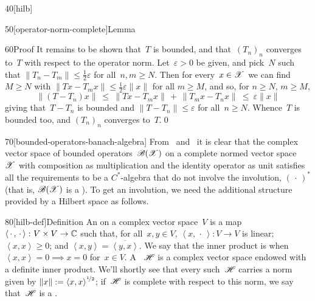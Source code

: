 \begin{parsec}{40}[hilb]
\begin{point}{50}[operator-norm-complete]{Lemma}
\begin{point}{60}{Proof}
It remains to be shown that~$T$ is bounded,
and that~$(T_n)_n$ converges to~$T$ with respect to the operator norm.
Let~$\varepsilon>0$ be given, and pick~$N$ such that
$\|T_n-T_m\|\leq \frac{1}{2}\varepsilon$ for all~$n,m\geq N$.
Then for every~$x\in \mathscr{X}$
we can find~$M\geq N$ with 
$\|T x - T_m x\|\leq \frac{1}{2}\varepsilon\|x\|$ for all $m\geq M$,
and so,
for $n\geq N$, $m\geq M$,
\begin{equation*}
\|(T - T_n) x\| \ \leq\ \|T x - T_mx\|\,+\,\|T_m x - T_n x\|
\ \leq\  \varepsilon\|x\|
\end{equation*}
giving that~$T-T_n$ is bounded
and $\|T-T_n\|\leq \varepsilon$ for all~$n\geq N$.
Whence~$T$ is bounded too,
and $(T_n)_n$ converges to~$T$.\qed
\end{point}
\end{point}
\begin{point}{70}[bounded-operators-banach-algebra]%
From~
and~
it is clear that the complex vector space
of bounded operators~$\mathscr{B}(\mathscr{X})$
on a complete normed vector space~$\mathscr{X}$
with composition as multiplication
and the identity operator as unit
satisfies all the requirements
to be a $C^*$-algebra that do not involve the involution, $(\,\cdot\,)^*$
(that is, $\mathscr{B}(\mathscr{X})$ is a ).
To get an involution,
we need the additional structure
provided by a Hilbert space as follows.
\end{point}
\begin{point}{80}[hilb-def]{Definition}%
An %
on a complex vector space~$V$ 
is a map $\left<\,\cdot\,,\,\cdot\,\right>\colon V\times V\to \mathbb{C}$%
such that,
for all~$x,y\in V$,
$\left<x,\,\cdot\,\right>\colon V\to V$ is linear;
$\left<x,x\right>\geq 0$;
and
$\left<x,y\right>=\overline{\left<y,x\right>}$.
We say that the inner product is %
when~$\left<x,x\right>=0\implies x=0$ for~$x\in V$.
A ~$\mathscr{H}$%
is a complex vector space endowed with a definite inner product.
We'll shortly see that every such~$\mathscr{H}$
carries a norm
given by
 $\|x\|:= \left<x,x\right>^{\nicefrac{1}{2}}$;
if~$\mathscr{H}$ is complete with respect to this norm,
we say that~$\mathscr{H}$ is a .%


\end{point}
\end{parsec}
